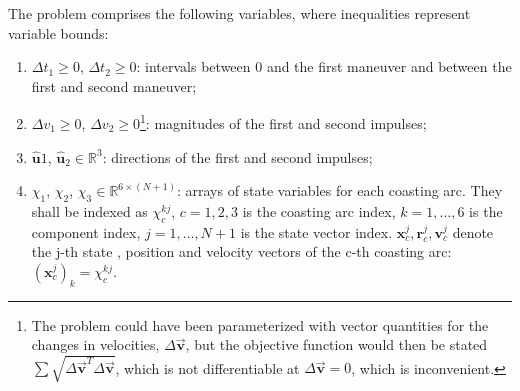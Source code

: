 The problem comprises the following variables, where inequalities represent variable bounds:
\begin{enumerate}
    \item \(\Delta t_1 \geq 0\), \(\Delta t_2 \geq 0\): intervals between 0 and the first maneuver and between the first and second maneuver;
    \item \(\Delta v_1 \geq 0\), \(\Delta v_2 \geq 0\)\footnote{The problem could have been parameterized with vector quantities for the changes in velocities, \(\Delta \vec{\mathbf{v}}\), but the objective function would then be stated \(\sum \sqrt{\Delta \vec{\mathbf{v}}^T \Delta \vec{\mathbf{v}}}\), which is not differentiable at \(\Delta \vec {\mathbf{v}} = 0\), which is inconvenient.}: magnitudes of the first and second impulses;
    \item \(\hat{\mathbf{u}} 1\), \(\hat{\mathbf{u}}_2 \in \mathbb{R}^3\): directions of the first and second impulses;
    \item \(\chi_1\), \(\chi_2\), \(\chi_3 \in \mathbb{R}^{6 \times (N+1)}\): arrays of state variables for each coasting arc. They shall be indexed as \(\chi_c^{kj}\), \(c=1, 2, 3\) is the coasting arc index, \(k=1,\dots,6\) is the component index, \(j = 1,\dots,N+1\) is the state vector index. \(\mathbf{x}^j_c, \mathbf{r}^j_c, \mathbf{v}^j_c\) denote the j-th state , position and velocity vectors of the c-th coasting arc: \((\mathbf{x}^j_c)_k = \chi_c^{kj}\).
\end{enumerate}

